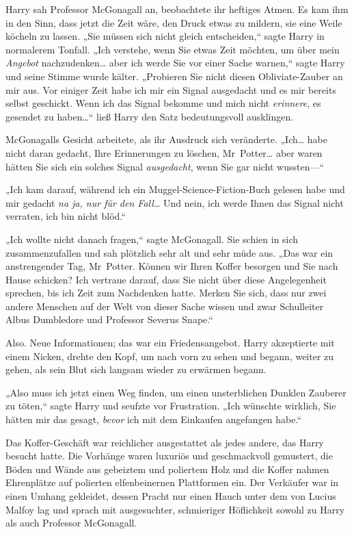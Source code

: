 {Harry sah Professor McGonagall an, beobachtete ihr heftiges Atmen. Es kam ihm in den Sinn, dass jetzt die Zeit wäre, den Druck etwas zu mildern, sie eine Weile köcheln zu lassen. „Sie müssen sich nicht gleich entscheiden,“ sagte Harry in normalerem Tonfall. „Ich verstehe, wenn Sie etwas Zeit möchten, um über mein \emph{Angebot} nachzudenken… aber ich werde Sie vor einer Sache warnen,“ sagte Harry und seine Stimme wurde kälter. „Probieren Sie nicht diesen Obliviate-Zauber an mir aus. Vor einiger Zeit habe ich mir ein Signal ausgedacht und es mir bereits selbst geschickt. Wenn ich das Signal bekomme und mich nicht \emph{erinnere}, es gesendet zu haben…“ ließ Harry den Satz bedeutungsvoll ausklingen.

McGonagalls Gesicht arbeitete, als ihr Ausdruck sich veränderte. „Ich… habe nicht daran gedacht, Ihre Erinnerungen zu löschen, Mr~Potter… aber waren hätten Sie sich ein solches Signal \emph{ausgedacht}, wenn Sie gar nicht wussten—“

„Ich kam darauf, während ich ein Muggel-Science-Fiction-Buch gelesen habe und mir gedacht \emph{na ja, nur für den Fall…} Und nein, ich werde Ihnen das Signal nicht verraten, ich bin nicht blöd.“

„Ich wollte nicht danach fragen,“ sagte McGonagall. Sie schien in sich zusammenzufallen und sah plötzlich sehr alt und sehr müde aus. „Das war ein anstrengender Tag, Mr~Potter. Können wir Ihren Koffer besorgen und Sie nach Hause schicken? Ich vertraue darauf, dass Sie nicht über diese Angelegenheit sprechen, bis ich Zeit zum Nachdenken hatte. Merken Sie sich, dass nur zwei andere Menschen auf der Welt von dieser Sache wissen und zwar Schulleiter Albus Dumbledore und Professor Severus Snape.“

Also. Neue Informationen; das war ein Friedensangebot. Harry akzeptierte mit einem Nicken, drehte den Kopf, um nach vorn zu sehen und begann, weiter zu gehen, als sein Blut sich langsam wieder zu erwärmen begann.

„Also muss ich jetzt einen Weg finden, um einen unsterblichen Dunklen Zauberer zu töten,“ sagte Harry und seufzte vor Frustration. „Ich wünschte wirklich, Sie hätten mir das gesagt, \emph{bevor} ich mit dem Einkaufen angefangen habe.“

\later

Das Koffer-Geschäft war reichlicher ausgestattet als jedes andere, das Harry besucht hatte. Die Vorhänge waren luxuriös und geschmackvoll gemustert, die Böden und Wände aus gebeiztem und poliertem Holz und die Koffer nahmen Ehrenplätze auf polierten elfenbeinernen Plattformen ein. Der Verkäufer war in einen Umhang gekleidet, dessen Pracht nur einen Hauch unter dem von Lucius Malfoy lag und sprach mit ausgesuchter, schmieriger Höflichkeit sowohl zu Harry als auch Professor McGonagall.

}

